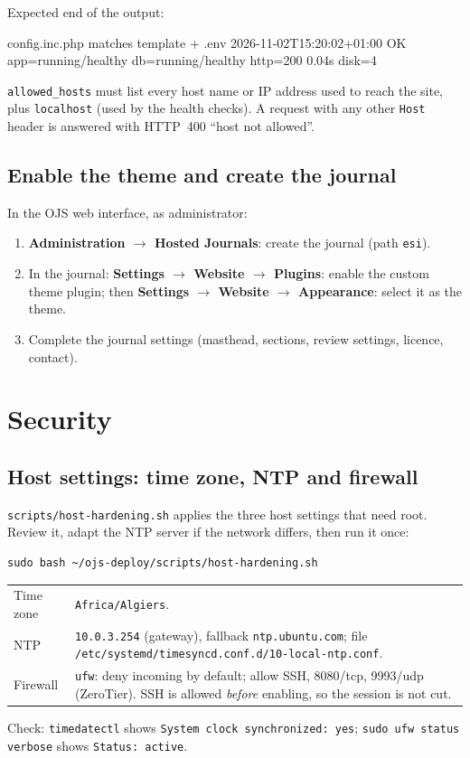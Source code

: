 \documentclass[11pt,a4paper]{report}
\newcommand{\code}[1]{\texttt{\small #1}}
\newcommand{\file}[1]{\texttt{\small #1}}
\begin{document}
Expected end of the output:
\begin{termout}
config.inc.php matches template + .env
2026-11-02T15:20:02+01:00 OK app=running/healthy db=running/healthy http=200 0.04s disk=4%
\end{termout}

\begin{warning}
\code{allowed\_hosts} must list every host name or IP address used to reach the site, plus
\code{localhost} (used by the health checks). A request with any other \code{Host} header is
answered with HTTP~400 ``host not allowed''.
\end{warning}

\section{Enable the theme and create the journal}
In the OJS web interface, as administrator:
\begin{enumerate}
  \item \textbf{Administration $\to$ Hosted Journals}: create the journal (path \code{esi}).
  \item In the journal: \textbf{Settings $\to$ Website $\to$ Plugins}: enable the custom theme plugin;
        then \textbf{Settings $\to$ Website $\to$ Appearance}: select it as the theme.
  \item Complete the journal settings (masthead, sections, review settings, licence, contact).
\end{enumerate}

\chapter{Security}\label{ch:security}

\section{Host settings: time zone, NTP and firewall}
\file{scripts/host-hardening.sh} applies the three host settings that need root. Review it,
adapt the NTP server if the network differs, then run it once:
\begin{lstlisting}
sudo bash ~/ojs-deploy/scripts/host-hardening.sh
\end{lstlisting}
\begin{tabularx}{\linewidth}{@{}P{3.4cm}L@{}}
\toprule
Time zone & \code{Africa/Algiers}. \\
NTP       & \code{10.0.3.254} (gateway), fallback \code{ntp.ubuntu.com}; file \file{/etc/systemd/timesyncd.conf.d/10-local-ntp.conf}. \\
Firewall  & \code{ufw}: deny incoming by default; allow SSH, 8080/tcp, 9993/udp (ZeroTier). SSH is allowed \emph{before} enabling, so the session is not cut. \\
\bottomrule
\end{tabularx}
Check: \code{timedatectl} shows \code{System clock synchronized: yes};
\code{sudo ufw status verbose} shows \code{Status: active}.
\end{document}
